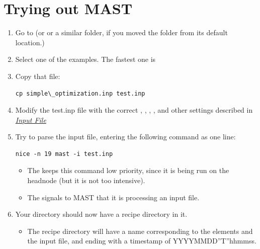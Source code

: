 \documentclass[letterpaper,10pt,english]{sphinxmanual}
\begin{document}
\chapter{Trying out MAST}
\label{17_0_testmast:trying-out-mast}\label{17_0_testmast::doc}\begin{enumerate}
\item {} 
Go to  (or  or a similar folder, if you moved the  folder from its default location.)

\item {} 
Select one of the examples. The fastest one is 

\item {} 
Copy that file:

\begin{Verbatim}[commandchars=\\\{\}]
cp simple\_optimization.inp test.inp
\end{Verbatim}

\item {} 
Modify the test.inp file with the correct , , , , and other settings described in {\hyperref[3_0_inputfile::doc]{\emph{Input File}}}

\item {} 
Try to parse the input file, entering the following command as one line:

\begin{Verbatim}[commandchars=\\\{\}]
nice -n 19 mast -i test.inp
\end{Verbatim}
\begin{itemize}
\item {} 
The  keeps this command low priority, since it is being run on the headnode (but it is not too intensive).

\item {} 
The  signals to MAST that it is processing an input file.

\end{itemize}

\item {} 
Your  directory should now have a recipe directory in it.
\begin{itemize}
\item {} 
The recipe directory will have a name corresponding to the elements and the input file, and ending with a timestamp of YYYYMMDD''T''hhmmss.


\end{itemize}
\end{enumerate}
\end{document}
